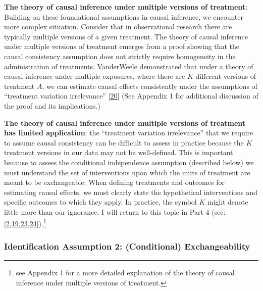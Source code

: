 \documentclass[
  singlecolumn]{article}
\begin{document}
\textbf{The theory of causal inference under multiple versions of
treatment}: Building on these foundational assumptions in causal
inference, we encounter more complex situation. Consider that in
observational research there are typically multiple versions of a given
treatment. The theory of causal inference under multiple versions of
treatment emerges from a proof showing that the causal consistency
assumption does not strictly require homogeneity in the administration
of treatments. VanderWeele demonstrated that under a theory of causal
inference under multiple exposures, where there are \(K\) different
versions of treatment \(A\), we can estimate causal effects consistently
under the assumptions of ``treatment variation irrelevance''
{[}\protect\hyperlink{ref-vanderweele2009}{20}{]} (See Appendix 1 for
additional discussion of the proof and its implications.)

\textbf{The theory of causal inference under multiple versions of
treatment has limited application}: the ``treatment variation
irrelevance'' that we require to assume causal consistency can be
difficult to assess in practice because the \(K\) treatment versions in
our data may not be well-defined. This is important because to assess
the conditional independence assumption (described below) we must
understand the set of interventions upon which the units of treatment
are meant to be exchangeable. When defining treatments and outcomes for
estimating causal effects, we must clearly state the hypothetical
interventions and specific outcomes to which they apply. In practice,
the symbol \(K\) m️ight denote little more than our ignorance. I will
return to this topic in Part 4 (see:
{[}\protect\hyperlink{ref-bulbulia2022}{2},\protect\hyperlink{ref-murray2021a}{19},\protect\hyperlink{ref-hernuxe1n2022a}{23},\protect\hyperlink{ref-hernuxe1n2008}{24}{]}).\footnote{see
  Appendix 1 for a more detailed explanation of the theory of causal
  inference under multiple versions of treatment.}

\hypertarget{identification-assumption-2-conditional-exchangeability}{%
\subsubsection{Identification Assumption 2: (Conditional)
Exchangeability}\label{identification-assumption-2-conditional-exchangeability}}
\end{document}
